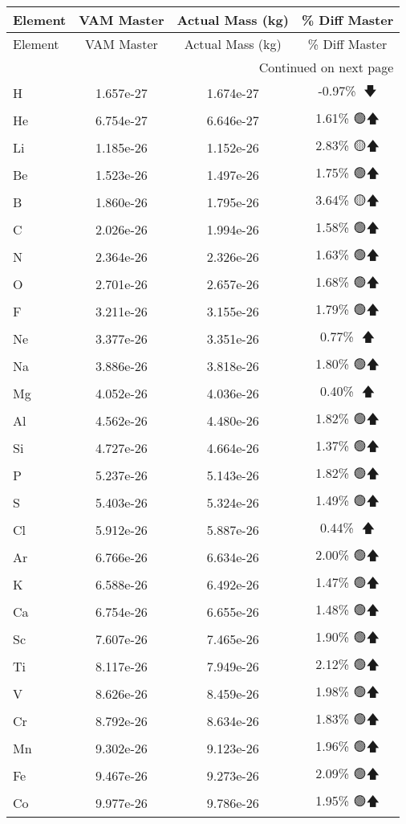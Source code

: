 \begin{longtable}{|l|c|c|c|}
\toprule
Element & VAM Master & Actual Mass (kg) & \% Diff Master \\
\midrule
\endfirsthead
\toprule
Element & VAM Master & Actual Mass (kg) & \% Diff Master \\
\midrule
\endhead
\midrule
\multicolumn{4}{r}{Continued on next page} \\
\midrule
\endfoot
\bottomrule
\endlastfoot
H & 1.657e-27 & 1.674e-27 & -0.97\% 🩷🡇 \\
He & 6.754e-27 & 6.646e-27 & 1.61\% 🟢🡅 \\
Li & 1.185e-26 & 1.152e-26 & 2.83\% 🟡🡅 \\
Be & 1.523e-26 & 1.497e-26 & 1.75\% 🟢🡅 \\
B & 1.860e-26 & 1.795e-26 & 3.64\% 🟡🡅 \\
C & 2.026e-26 & 1.994e-26 & 1.58\% 🟢🡅 \\
N & 2.364e-26 & 2.326e-26 & 1.63\% 🟢🡅 \\
O & 2.701e-26 & 2.657e-26 & 1.68\% 🟢🡅 \\
F & 3.211e-26 & 3.155e-26 & 1.79\% 🟢🡅 \\
Ne & 3.377e-26 & 3.351e-26 & 0.77\% 🩷🡅 \\
Na & 3.886e-26 & 3.818e-26 & 1.80\% 🟢🡅 \\
Mg & 4.052e-26 & 4.036e-26 & 0.40\% 🩷🡅 \\
Al & 4.562e-26 & 4.480e-26 & 1.82\% 🟢🡅 \\
Si & 4.727e-26 & 4.664e-26 & 1.37\% 🟢🡅 \\
P & 5.237e-26 & 5.143e-26 & 1.82\% 🟢🡅 \\
S & 5.403e-26 & 5.324e-26 & 1.49\% 🟢🡅 \\
Cl & 5.912e-26 & 5.887e-26 & 0.44\% 🩷🡅 \\
Ar & 6.766e-26 & 6.634e-26 & 2.00\% 🟢🡅 \\
K & 6.588e-26 & 6.492e-26 & 1.47\% 🟢🡅 \\
Ca & 6.754e-26 & 6.655e-26 & 1.48\% 🟢🡅 \\
Sc & 7.607e-26 & 7.465e-26 & 1.90\% 🟢🡅 \\
Ti & 8.117e-26 & 7.949e-26 & 2.12\% 🟢🡅 \\
V & 8.626e-26 & 8.459e-26 & 1.98\% 🟢🡅 \\
Cr & 8.792e-26 & 8.634e-26 & 1.83\% 🟢🡅 \\
Mn & 9.302e-26 & 9.123e-26 & 1.96\% 🟢🡅 \\
Fe & 9.467e-26 & 9.273e-26 & 2.09\% 🟢🡅 \\
Co & 9.977e-26 & 9.786e-26 & 1.95\% 🟢🡅 \\

\end{longtable}
